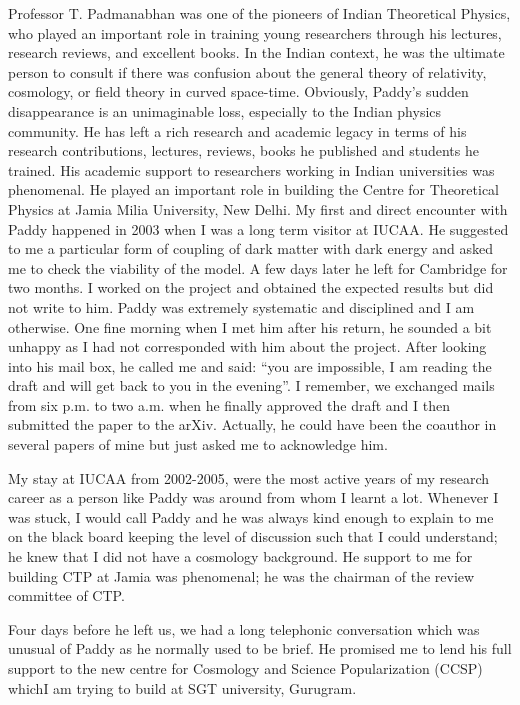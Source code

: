 \documentclass[prd, preprint, longbibliography, 12pt]{revtex4-2}
\begin{document}
\noindent Professor T. Padmanabhan was one of the pioneers of Indian Theoretical Physics, who  played an important role in training  young researchers through his lectures, research reviews, and excellent books. In the Indian context, he was the ultimate person to consult if there was confusion about the general theory of relativity, cosmology, or field theory in curved space-time. Obviously, Paddy’s sudden disappearance is an unimaginable loss, especially to the Indian physics community. He has left a rich research and academic legacy in terms of his research contributions, lectures, reviews, books he published and students he trained. His academic support to researchers working in Indian universities was phenomenal. He played an important role in building the Centre for Theoretical Physics at Jamia Milia University, New Delhi. My first and direct encounter with Paddy happened in 2003 when I was a long term visitor at IUCAA. He suggested to me a particular form of coupling of dark matter with dark energy and asked me to check the viability of the model. A few days later he left for Cambridge for two months. I worked on the project and obtained the expected results but did not write to him. Paddy was extremely systematic and disciplined and I am otherwise. One fine morning when I met him after his return, he sounded a bit unhappy as I had not corresponded with him about the project. After looking into his mail box, he called me and said: “you are impossible, I am reading the draft and will get back to you in the evening”. I remember, we exchanged mails from six p.m. to two a.m. when he finally approved the draft and I then submitted the paper to  the arXiv. Actually, he could have been the coauthor in several papers of mine but just asked me to acknowledge him.

    My stay at IUCAA from 2002-2005, were the most active years of my research career as a person like Paddy was around from whom I learnt a lot. Whenever I was stuck, I would call Paddy and he was always kind enough to explain to me on the black board keeping the level of discussion such that I could understand; he knew that I did not have a cosmology background. He support to me for building CTP at Jamia was phenomenal; he was  the chairman of the review committee of CTP. 
    
         Four days before he left us, we had a long telephonic conversation which was unusual of Paddy as he normally used to be brief. He promised me to lend his full support to the new centre for Cosmology and Science Popularization (CCSP) whichI am trying to build at SGT university, Gurugram. 
         
\end{document}
